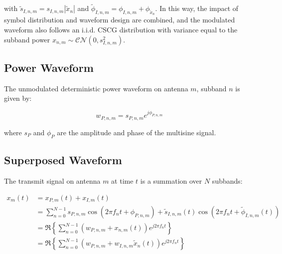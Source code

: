 with ${{\tilde s}_{I,n,m}} = {s_{I,n,m}}\left| {{{\tilde x}_n}} \right|$ and ${{\tilde \phi }_{I,n,m}} = {\phi _{I,n,m}} + {\phi _{{{\tilde x}_n}}}$. In this way, the impact of symbol distribution and waveform design are combined, and the modulated waveform also follows an i.i.d. CSCG distribution with variance equal to the subband power ${x_{n,m}}\sim\mathcal{C}\mathcal{N}\left( {0,s_{I,n,m}^2} \right)$.

\subsection{Power Waveform}
The unmodulated deterministic power waveform on antenna $m$, subband $n$ is given by:

\begin{equation}\label{eqn:unmodulated}
  {w_{P,n,m}} = {s_{P,n,m}}{e^{j{\phi _{P,n,m}}}}
\end{equation}

where ${s_{P}}$ and ${{\phi _{P}}}$ are the amplitude and phase of the multisine signal.

\subsection{Superposed Waveform}
The transmit signal on antenna $m$ at time $t$ is a summation over $N$ subbands:

\begin{align}\label{eqn:transmit_signal}
  {x_m}(t) &= {x_{P,m}}(t) + {x_{I,m}}(t) \\
   &= \sum\limits_{n = 0}^{N - 1} {{s_{P,n,m}}} \cos \left( {2\pi {f_n}t + {\phi _{P,n,m}}} \right) + {{\tilde s}_{I,n,m}}(t)\cos \left( {2\pi {f_n}t + {{\tilde \phi }_{I,n,m}}(t)} \right) \\
   &= \Re \left\{ {\sum\limits_{n = 0}^{N - 1} {\left( {{w_{P,n,m}} + {x_{n,m}}(t)} \right)} {e^{j2\pi {f_n}t}}} \right\} \\
   &= \Re \left\{ {\sum\limits_{n = 0}^{N - 1} {\left( {{w_{P,n,m}} + {w_{I,n,m}}{{\tilde x}_n}(t)} \right)} {e^{j2\pi {f_n}t}}} \right\}
\end{align}



